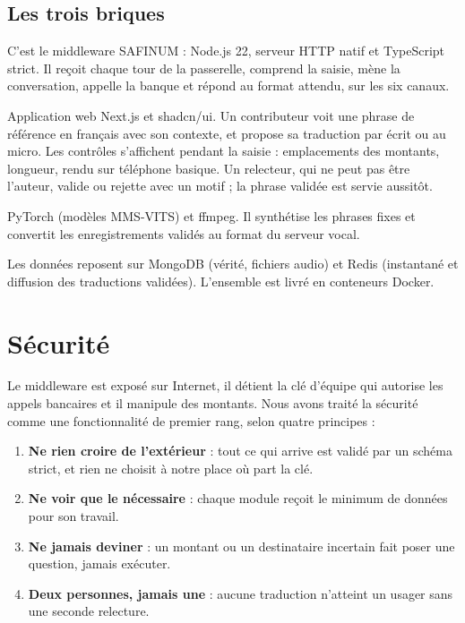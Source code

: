 \documentclass[11pt,a4paper]{article}
\begin{document}
\subsection{Les trois briques}
\begin{description}[leftmargin=0pt]
  \item[Le gateway.] C'est le middleware SAFINUM : Node.js 22, serveur HTTP natif et TypeScript strict. Il reçoit chaque tour de la passerelle, comprend la saisie, mène la conversation, appelle la banque et répond au format attendu, sur les six canaux.
  \item[Le studio linguistique.] Application web Next.js et shadcn/ui. Un contributeur voit une phrase de référence en français avec son contexte, et propose sa traduction par écrit ou au micro. Les contrôles s'affichent pendant la saisie : emplacements des montants, longueur, rendu sur téléphone basique. Un relecteur, qui ne peut pas être l'auteur, valide ou rejette avec un motif ; la phrase validée est servie aussitôt.
  \item[Le service voix.] PyTorch (modèles MMS-VITS) et ffmpeg. Il synthétise les phrases fixes et convertit les enregistrements validés au format du serveur vocal.
\end{description}
Les données reposent sur MongoDB (vérité, fichiers audio) et Redis (instantané et diffusion des traductions validées). L'ensemble est livré en conteneurs Docker.

\clearpage
\section{Sécurité}
Le middleware est exposé sur Internet, il détient la clé d'équipe qui autorise les appels bancaires et il manipule des montants. Nous avons traité la sécurité comme une fonctionnalité de premier rang, selon quatre principes :
\begin{enumerate}
  \item \textbf{Ne rien croire de l'extérieur} : tout ce qui arrive est validé par un schéma strict, et rien ne choisit à notre place où part la clé.
  \item \textbf{Ne voir que le nécessaire} : chaque module reçoit le minimum de données pour son travail.
  \item \textbf{Ne jamais deviner} : un montant ou un destinataire incertain fait poser une question, jamais exécuter.
  \item \textbf{Deux personnes, jamais une} : aucune traduction n'atteint un usager sans une seconde relecture.
\end{enumerate}
\end{document}
